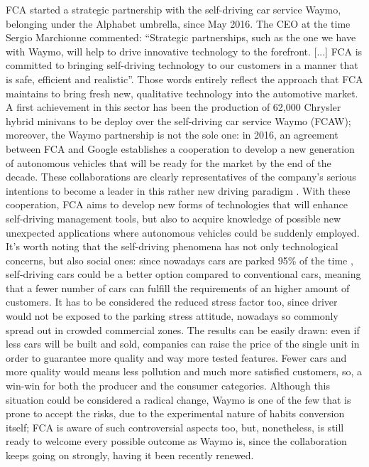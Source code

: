 FCA started a strategic partnership with the self-driving car service Waymo, belonging under the Alphabet umbrella, since May 2016. The CEO at the time Sergio Marchionne commented: “Strategic partnerships, such as the one we have with Waymo, will help to drive innovative technology to the forefront. [...] FCA is committed to bringing self-driving technology to our customers in a manner that is safe, efficient and realistic”.
Those words entirely reflect the approach that FCA maintains to bring fresh new, qualitative technology into the automotive market.
A first achievement in this sector has been the production of 62,000 Chrysler hybrid minivans to be deploy over the self-driving car service Waymo (FCAW); moreover, the Waymo partnership is not the sole one: in 2016, an agreement between FCA and Google establishes a cooperation to develop a new generation of autonomous vehicles
\cite{fca_google} that will be ready for the market by the end of the decade. These collaborations are clearly representatives of the company's serious intentions to become a leader in this rather new driving paradigm \cite{fca_waymo_partnership}. With these cooperation, FCA aims to develop new forms of technologies that will enhance self-driving management tools, but also to acquire knowledge of possible new unexpected applications where autonomous vehicles could be suddenly employed.
It's worth noting that the self-driving phenomena has not only technological concerns, but also social ones: since nowadays cars are parked 95\% of the time \cite{fca_cars_95_parked}, self-driving cars could be a better option compared to conventional cars, meaning that a fewer number of cars can fulfill the requirements of an higher amount of customers. It has to be considered the reduced stress factor too, since driver would not be exposed to the parking stress attitude, nowadays so commonly spread out in crowded commercial zones. The results can be easily drawn: even if less cars will be built and sold, companies can raise the price of the single unit in order to guarantee more quality and way more tested features. Fewer cars and more quality would means less pollution and much more satisfied customers, so, a win-win for both the producer and the consumer categories. 
Although this situation could be considered a radical change, Waymo is one of the few that is prone to accept the risks, due to the experimental nature of habits conversion itself; FCA is aware of such controversial aspects too, but, nonetheless, is still ready to welcome every possible outcome as Waymo is, since the collaboration keeps going on strongly, having it been recently renewed\cite{fca_waymo_renew}.

